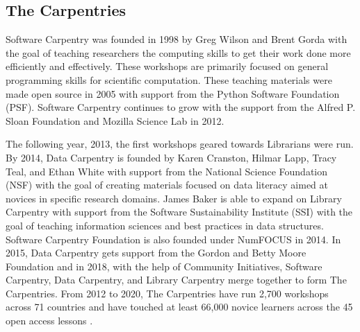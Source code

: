 \documentclass[010-intro.tex]{subfiles}
\begin{document}
    \subsection{The Carpentries}

        Software Carpentry was founded in 1998 by Greg Wilson and Brent Gorda with the goal of
        teaching researchers the computing skills to get their work done more efficiently and effectively.
        These workshops are primarily focused on general programming skills for scientific computation.
        These teaching materials were made open source in 2005 with support from the Python Software Foundation (PSF).
        Software Carpentry continues to grow with the support from the Alfred P. Sloan Foundation and Mozilla Science Lab in 2012.


        The following year, 2013, the first workshops geared towards Librarians were run.
        By 2014, Data Carpentry is founded by Karen Cranston, Hilmar Lapp, Tracy Teal, and Ethan White
        with support from the National Science Foundation (NSF)
        with the goal of creating materials focused on data literacy aimed at novices in specific research domains.
        James Baker is able to expand on Library Carpentry with support from the Software Sustainability Institute (SSI)
        with the goal of teaching information sciences and best practices in data structures.
        Software Carpentry Foundation is also founded under NumFOCUS in 2014.
        In 2015, Data Carpentry gets support from the Gordon and Betty Moore Foundation and
        in 2018, with the help of Community Initiatives, Software Carpentry, Data Carpentry, and Library Carpentry
        merge together to form The Carpentries.
        From 2012 to 2020, The Carpentries have run
        2,700 workshops across 71 countries and have touched at least 66,000 novice learners
        across the 45 open access lessons
        \cite{CarpentriesHowWe, jordanCarpentries2020Annual}.
\end{document}
